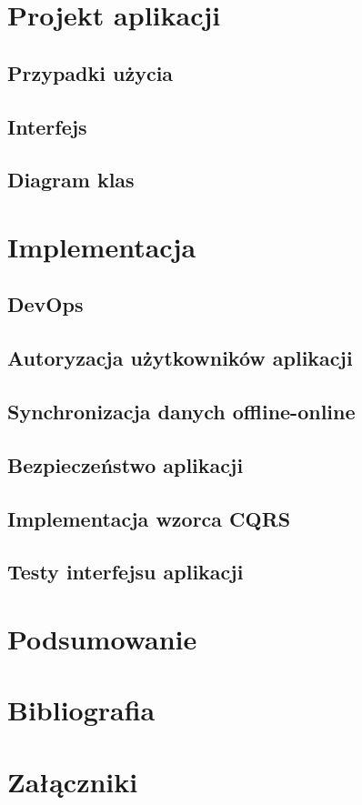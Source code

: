 \chapter{Projekt aplikacji}
\section{Przypadki użycia}
\section{Interfejs}
\section{Diagram klas}
\chapter{Implementacja}
\section{DevOps}
\section{Autoryzacja użytkowników aplikacji}
\section{Synchronizacja danych offline-online}
\section{Bezpieczeństwo aplikacji}
\section{Implementacja wzorca CQRS}
\section{Testy interfejsu aplikacji}
\chapter{Podsumowanie}
\chapter*{Bibliografia}
\chapter*{Załączniki}
